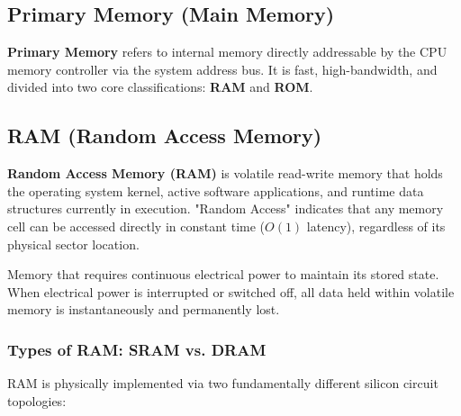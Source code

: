 \subsection{Primary Memory (Main Memory)}

\textbf{Primary Memory} refers to internal memory directly addressable by the CPU memory controller via the system address bus. It is fast, high-bandwidth, and divided into two core classifications: \textbf{RAM} and \textbf{ROM}.

\subsection{RAM (Random Access Memory)}

\textbf{Random Access Memory (RAM)} is volatile read-write memory that holds the operating system kernel, active software applications, and runtime data structures currently in execution. "Random Access" indicates that any memory cell can be accessed directly in constant time ($O(1)$ latency), regardless of its physical sector location.

\begin{definition}
Memory that requires continuous electrical power to maintain its stored state. When electrical power is interrupted or switched off, all data held within volatile memory is instantaneously and permanently lost.
\end{definition}

\subsubsection{Types of RAM: SRAM vs. DRAM}
RAM is physically implemented via two fundamentally different silicon circuit topologies:

